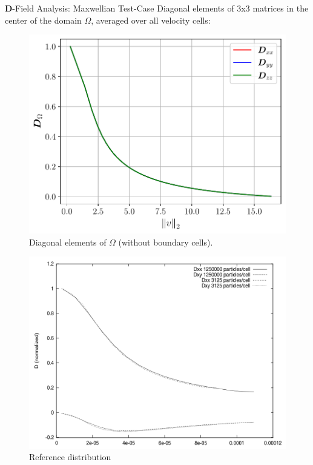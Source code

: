 \begin{frame}[c]{$\boldsymbol D$-Field Analysis: Maxwellian Test-Case}
    Diagonal elements of 3x3 matrices in the center of the domain $\Omega$, averaged over all velocity cells:
    \begin{multicols}{2}
    \begin{figure}[!htb]
        \centering
        \captionsetup{justification=centering}
      \includegraphics[width=1.03\linewidth]{figures/D_diagonal.pdf}
      \caption{Diagonal elements of $\Omega$ (without boundary cells).}
      \label{fig:Fd_asymptotic_behavior_2nd}
    \end{figure}
    \columnbreak
    \begin{figure}[!htb]
        \centering
        \captionsetup{justification=centering}
      \includegraphics[width=1.03\linewidth]{figures/reference_distribution_maxwell.png}
      \caption{Reference distribution \cite{Qiang_selfConsistentLangevin}}
      \label{fig:Fd_asymptotic_behavior_reference}
    \end{figure}
    \end{multicols}
\end{frame}

